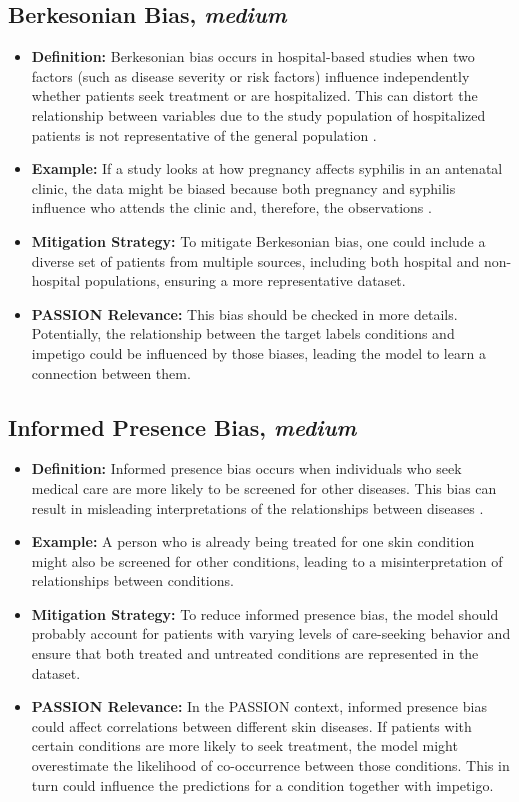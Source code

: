 \documentclass[12pt, a4paper, oneside]{book}   	%
\begin{document}
\begin{appendices}
		\subsection{Berkesonian Bias, \textit{medium}}
		\begin{itemize}
			\item \textbf{Definition:} Berkesonian bias occurs in hospital-based studies when two factors (such as disease severity or risk factors) influence independently whether patients seek treatment or are hospitalized. This can distort the relationship between variables due to the study population of hospitalized patients is not representative of the general population \autocite{c3, c7, Chakraborty_2024}.
			\item \textbf{Example:} If a study looks at how pregnancy affects syphilis in an antenatal clinic, the data might be biased because both pregnancy and syphilis influence who attends the clinic and, therefore, the observations \autocite{c3, c7, Chakraborty_2024}.
			\item \textbf{Mitigation Strategy:} To mitigate Berkesonian bias, one could include a diverse set of patients from multiple sources, including both hospital and non-hospital populations, ensuring a more representative dataset.
			\item \textbf{PASSION Relevance:} This bias should be checked in more details. Potentially, the relationship between the target labels conditions and impetigo could be influenced by those biases, leading the model to learn a connection between them.
		\end{itemize}
		
		\subsection{Informed Presence Bias, \textit{medium}}
		\begin{itemize}
			\item \textbf{Definition:} Informed presence bias occurs when individuals who seek medical care are more likely to be screened for other diseases. This bias can result in misleading interpretations of the relationships between diseases \autocite{c27, c23, Chakraborty_2024}.
			\item \textbf{Example:} A person who is already being treated for one skin condition might also be screened for other conditions, leading to a misinterpretation of relationships between conditions.
			\item \textbf{Mitigation Strategy:} To reduce informed presence bias, the model should probably account for patients with varying levels of care-seeking behavior and ensure that both treated and untreated conditions are represented in the dataset.
			\item \textbf{PASSION Relevance:} In the PASSION context, informed presence bias could affect correlations between different skin diseases. If patients with certain conditions are more likely to seek treatment, the model might overestimate the likelihood of co-occurrence between those conditions. This in turn could influence the predictions for a condition together with impetigo.
		\end{itemize}
		

\end{appendices}
\end{document}
